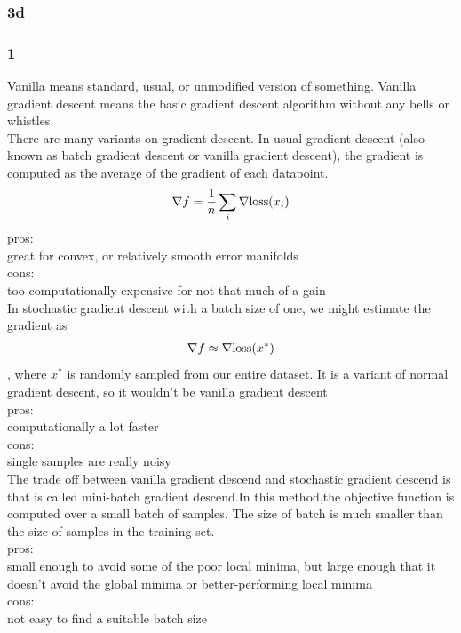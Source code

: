\documentclass{article}
\begin{document}
\subsubsection*{3d}
\subsubsection*{1}
Vanilla means standard, usual, or unmodified version of something. Vanilla gradient descent means the basic gradient descent algorithm without any bells or whistles.\\
There are many variants on gradient descent. In usual gradient descent (also known as batch gradient descent or vanilla gradient descent), the gradient is computed as the average of the gradient of each datapoint.\\
\begin{equation}\notag
\begin{aligned}
\nabla f = \frac{1}{n}\sum_i \nabla \text{loss}(x_i)
\end{aligned}
\end{equation}
pros:\\
great for convex, or relatively smooth error manifolds\\
cons:\\
too computationally expensive for not that much of a gain\\[15pt]
In stochastic gradient descent with a batch size of one, we might estimate the gradient as
\begin{equation}\notag
\begin{aligned}
\nabla f \approx \nabla \text{loss}(x^*)
\end{aligned}
\end{equation}
, where $x^*$ is randomly sampled from our entire dataset. It is a variant of normal gradient descent, so it wouldn't be vanilla gradient descent\\
pros:\\
computationally a lot faster\\
cons:\\
single samples are really noisy\\
The trade off between vanilla gradient descend and stochastic gradient descend is that is called mini-batch gradient descend.In this method,the objective function is computed over a small batch of samples. The size of batch is much smaller than the size of samples in the training set.\\
pros:\\
small enough to avoid some of the poor local minima, but large enough that it doesn't avoid the global minima or better-performing local minima\\
cons:\\
not easy to find a suitable batch size\\
\end{document}
